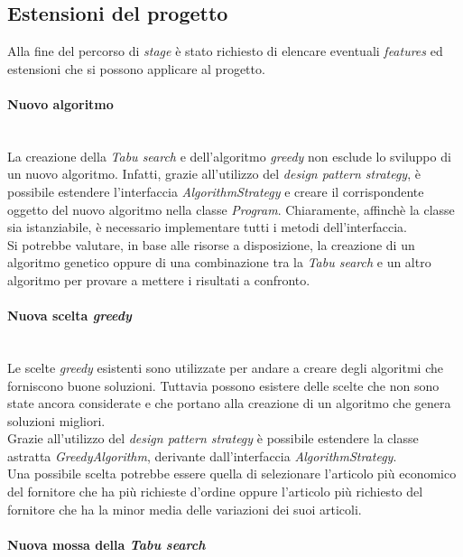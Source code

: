 \subsection{Estensioni del progetto}
\label{sec:estensioni-progetto}
\noindent Alla fine del percorso di \textit{stage} è stato richiesto di
elencare eventuali \textit{features} ed estensioni che si possono
applicare al progetto.
\vspace*{0.3cm}
\noindent \paragraph{Nuovo algoritmo}\hfill\\
La creazione della \textit{Tabu search} e dell'algoritmo \textit{greedy} non esclude
lo sviluppo di un nuovo algoritmo. Infatti, grazie all'utilizzo del \textit{design
pattern strategy}, è possibile estendere l'interfaccia
\textit{AlgorithmStrategy} e 
creare il corrispondente oggetto del nuovo algoritmo nella classe \textit{Program}.
Chiaramente, affinchè la classe sia istanziabile, è necessario
implementare tutti i metodi dell'interfaccia.\\
Si potrebbe valutare, in base alle risorse a disposizione, la creazione di un
algoritmo genetico oppure di una combinazione tra la \textit{Tabu search} e un altro algoritmo
per provare a mettere i risultati a confronto.
\vspace*{0.3cm}
\noindent \paragraph{Nuova scelta \textit{greedy}}\hfill\\
Le scelte \textit{greedy} esistenti sono utilizzate per andare
a creare degli algoritmi che forniscono buone soluzioni.
Tuttavia possono esistere delle scelte che non sono state ancora
considerate e che portano alla creazione di un algoritmo
che genera soluzioni migliori.\\
Grazie all'utilizzo del \textit{design
pattern strategy} è possibile estendere
la classe astratta \textit{GreedyAlgorithm}, derivante dall'interfaccia
\textit{AlgorithmStrategy}.\\
Una possibile scelta potrebbe essere quella di selezionare
l'articolo più economico del fornitore che ha più richieste d'ordine
oppure l'articolo più richiesto del fornitore
che ha la minor media delle variazioni dei suoi articoli.
\vspace*{0.3cm}
\noindent \paragraph{Nuova mossa della \textit{Tabu search}}\hfill\\
